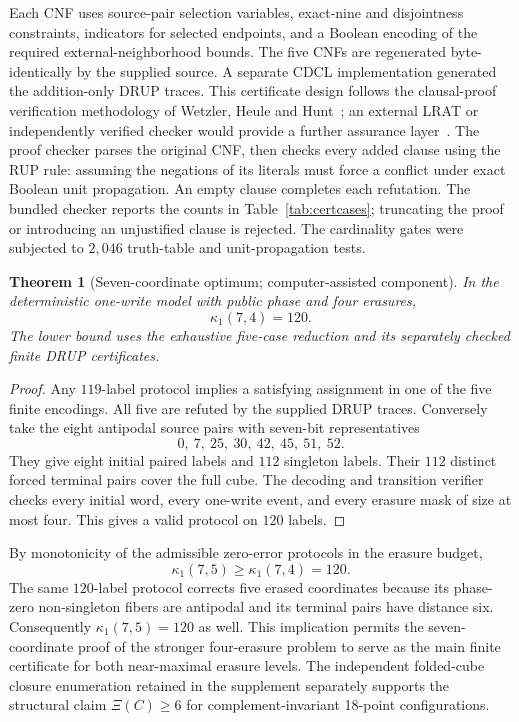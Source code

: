 \documentclass[11pt,a4paper]{article}
\newtheorem{theorem}{Theorem}[section]
\begin{document}


Each CNF uses source-pair selection variables, exact-nine and disjointness constraints, indicators for selected endpoints, and a Boolean encoding of the required external-neighborhood bounds. The five CNFs are regenerated byte-identically by the supplied source. A separate CDCL implementation generated the addition-only DRUP traces. This certificate design follows the clausal-proof verification methodology of Wetzler, Heule and Hunt~\cite{wetzler2014}; an external LRAT or independently verified checker would provide a further assurance layer~\cite{cruzfilipe2017}. The proof checker parses the original CNF, then checks every added clause using the RUP rule: assuming the negations of its literals must force a conflict under exact Boolean unit propagation. An empty clause completes each refutation. The bundled checker reports the counts in Table~\ref{tab:certcases}; truncating the proof or introducing an unjustified clause is rejected. The cardinality gates were subjected to $2{,}046$ truth-table and unit-propagation tests.

\begin{theorem}[Seven-coordinate optimum; computer-assisted component]\label{thm:seven-computer}
In the deterministic one-write model with public phase and four erasures,
\[
\boxed{\kappa_1(7,4)=120.}
\]
The lower bound uses the exhaustive five-case reduction and its separately checked finite DRUP certificates.
\end{theorem}
\begin{proof}
Any $119$-label protocol implies a satisfying assignment in one of the five finite encodings. All five are refuted by the supplied DRUP traces. Conversely take the eight antipodal source pairs with seven-bit representatives
\[
 0,\ 7,\ 25,\ 30,\ 42,\ 45,\ 51,\ 52.
\]
They give eight initial paired labels and $112$ singleton labels. Their $112$ distinct forced terminal pairs cover the full cube. The decoding and transition verifier checks every initial word, every one-write event, and every erasure mask of size at most four. This gives a valid protocol on $120$ labels.
\end{proof}

By monotonicity of the admissible zero-error protocols in the erasure budget,
\[
\kappa_1(7,5)\ge\kappa_1(7,4)=120.
\]
The same $120$-label protocol corrects five erased coordinates because its phase-zero non-singleton fibers are antipodal and its terminal pairs have distance six. Consequently $\kappa_1(7,5)=120$ as well. This implication permits the seven-coordinate proof of the stronger four-erasure problem to serve as the main finite certificate for both near-maximal erasure levels. The independent folded-cube closure enumeration retained in the supplement separately supports the structural claim $\Xi(C)\ge6$ for complement-invariant 18-point configurations.
\end{document}
